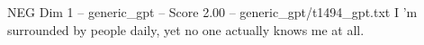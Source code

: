 \begin{textsample}{NEG Dim 1 – generic\_gpt – Score 2.00 – generic\_gpt/t1494\_gpt.txt}  \label{ex:f1_neg_036}
I ’m surrounded by people daily, yet no one actually knows me at all.

\end{textsample}
